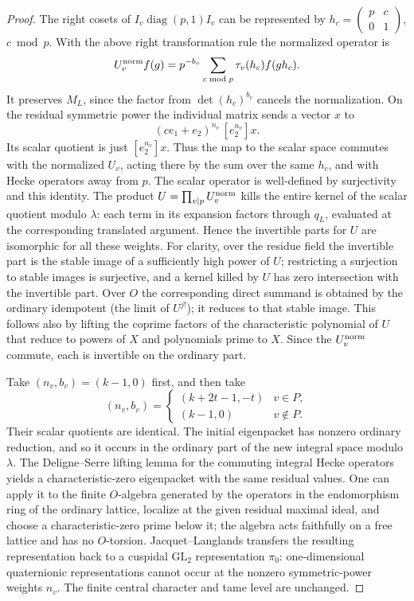 \begin{proof}
The right cosets of \(I_v\operatorname{diag}(p,1)I_v\) can be
represented by \(h_c=\left(\begin{smallmatrix}p&c\\0&1\end{smallmatrix}\right)\),
\(c\bmod p\). With the above right transformation rule the
normalized operator is
\[
 U_v^{\rm norm}f(g)=p^{-b_v}\sum_{c\bmod p}\tau_v(h_c) f(gh_c).
\]
It preserves \(M_L\), since the factor from \(\det(h_c)^{b_v}\)
cancels the normalization. On the residual symmetric power the
individual matrix sends a vector \(x\) to
\[
 (c e_1+e_2)^{n_v}\,[e_2^{n_v}]x .
\]
Its scalar quotient is just \([e_2^{n_v}]x\). Thus the map to
the scalar space commutes with the normalized \(U_v\), acting
there by the sum over the same \(h_c\), and with Hecke operators
away from \(p\). The scalar operator is well-defined by
surjectivity and this identity. The product \(U=\prod_{v\mid p}U_v^{\rm norm}\)
kills the entire kernel of the scalar quotient modulo \(\lambda\):
each term in its expansion factors through \(q_L\), evaluated
at the corresponding translated argument. Hence the invertible
parts for \(U\) are isomorphic for all these weights. For clarity,
over the residue field the invertible part is the stable image
of a sufficiently high power of \(U\); restricting a surjection
to stable images is surjective, and a kernel killed by \(U\)
has zero intersection with the invertible part. Over \(O\) the
corresponding direct summand is obtained by the ordinary idempotent
(the limit of \(U^{j!}\)); it reduces to that stable image.
This follows also by lifting the coprime factors of the
characteristic polynomial of \(U\) that reduce to powers of \(X\)
and polynomials prime to \(X\). Since the \(U_v^{\rm norm}\) commute,
each is invertible on the ordinary part.

Take \((n_v,b_v)=(k-1,0)\) first, and then take
\[
 (n_v,b_v)=
 \begin{cases}
 (k+2t-1,-t)&v\in P,\\
 (k-1,0)&v\notin P .
 \end{cases}
\]
Their scalar quotients are identical. The initial eigenpacket
has nonzero ordinary reduction, and so it occurs in the ordinary
part of the new integral space modulo \(\lambda\). The
Deligne--Serre lifting lemma for the commuting integral Hecke
operators yields a characteristic-zero eigenpacket with the same
residual values. One can apply it to the finite \(O\)-algebra
generated by the operators in the endomorphism ring of the
ordinary lattice, localize at the given residual maximal ideal,
and choose a characteristic-zero prime below it; the algebra
acts faithfully on a free lattice and has no \(O\)-torsion.
Jacquet--Langlands transfers the resulting representation back
to a cuspidal \(\mathrm{GL}_2\) representation \(\pi_0\):
one-dimensional quaternionic representations cannot occur at
the nonzero symmetric-power weights \(n_v\).
The finite central character and tame level are unchanged.


\end{proof}
